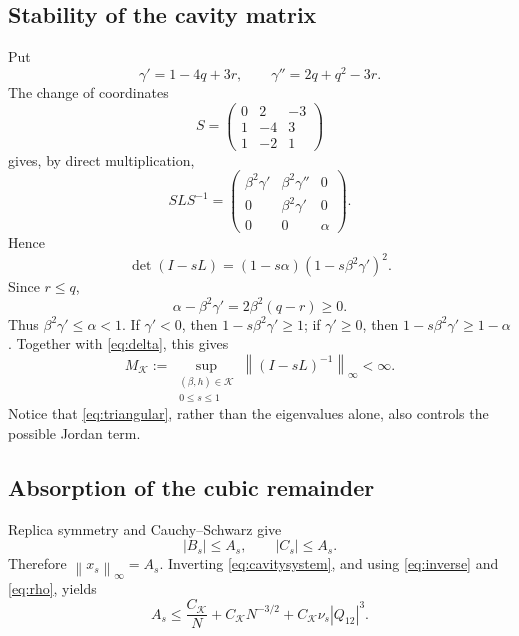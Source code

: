 \documentclass[11pt]{article}
\numberwithin{equation}{section}
\theoremstyle{plain}
\theoremstyle{definition}
\newcommand{\1}{\mathbf 1}
\newcommand{\cK}{\mathcal K}
\newcommand{\norm}[1]{\left\lVert #1\right\rVert}
\begin{document}
\subsection{Stability of the cavity matrix}\label{subsec:stability}

Put
\begin{equation}
 \gamma'=1-4q+3r,\qquad
 \gamma''=2q+q^2-3r.
 \label{eq:gammas}
\end{equation}
The change of coordinates
\[
 S=
 \begin{pmatrix}
 0&2&-3\\
 1&-4&3\\
 1&-2&1
 \end{pmatrix}
\]
gives, by direct multiplication,
\begin{equation}
 SLS^{-1}
 =
 \begin{pmatrix}
 \beta^2\gamma'&\beta^2\gamma''&0\\
 0&\beta^2\gamma'&0\\
 0&0&\alpha
 \end{pmatrix}.
 \label{eq:triangular}
\end{equation}
Hence
\begin{equation}
 \det(I-sL)
 =(1-s\alpha)(1-s\beta^2\gamma')^2.
 \label{eq:det}
\end{equation}
Since $r\le q$,
\[
 \alpha-\beta^2\gamma'
 =2\beta^2(q-r)\ge0.
\]
Thus $\beta^2\gamma'\le\alpha<1$.  If $\gamma'<0$, then
$1-s\beta^2\gamma'\ge1$; if $\gamma'\ge0$, then
$1-s\beta^2\gamma'\ge1-\alpha$.  Together with
\eqref{eq:delta}, this gives
\begin{equation}
 M_{\cK}:=
 \sup_{\substack{(\beta,h)\in\cK\\0\le s\le1}}
 \norm{(I-sL)^{-1}}_\infty<\infty.
 \label{eq:inverse}
\end{equation}
Notice that \eqref{eq:triangular}, rather than the eigenvalues alone,
also controls the possible Jordan term.

\subsection{Absorption of the cubic remainder}\label{subsec:absorb}

Replica symmetry and Cauchy--Schwarz give
\[
 |B_s|\le A_s,\qquad |C_s|\le A_s.
\]
Therefore $\norm{x_s}_\infty=A_s$.  Inverting
\eqref{eq:cavitysystem}, and using \eqref{eq:inverse} and
\eqref{eq:rho}, yields
\begin{equation}
 A_s
 \le \frac{C_{\cK}}N
 +C_{\cK}N^{-3/2}
 +C_{\cK}\nu_s|Q_{12}|^3.
 \label{eq:preabsorb}
\end{equation}
\end{document}
